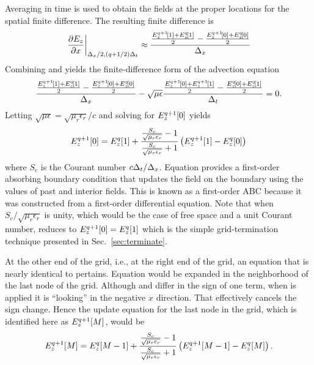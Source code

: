 Averaging in time is used to obtain the fields at the proper locations
for the spatial finite difference.  The resulting finite difference is
\begin{equation}
  \left.
    \frac{\partial E_z}{\partial x}\right|_{\Delx/2,(q+1/2)\Delt}
  \approx
    \frac{
     \frac{\fdtd{E_z}{1}{q+1}+\fdtd{E_z}{1}{q}}{2} -
     \frac{\fdtd{E_z}{0}{q+1}+\fdtd{E_z}{0}{q}}{2}
    }{\Delx}
  \label{eq:xDiffTimeAvg}
\end{equation}
Combining  and  yields
the finite-difference form of the advection equation
\begin{equation}
   \frac{
    \frac{\fdtd{E_z}{1}{q+1}+\fdtd{E_z}{1}{q}}{2} -
    \frac{\fdtd{E_z}{0}{q+1}+\fdtd{E_z}{0}{q}}{2}
   }{\Delx}
  -
   \sqrt{\mu\epsilon}
   \frac{
    \frac{\fdtd{E_z}{0}{q+1}+\fdtd{E_z}{1}{q+1}}{2} -
    \frac{\fdtd{E_z}{0}{q}+\fdtd{E_z}{1}{q}}{2}
   }{\Delt}
 = 0.
\end{equation}
Letting $\sqrt{\mu\epsilon}=\sqrt{\mu_r\epsilon_r}/c$ and
solving for $\fdtd{E_z}{0}{q+1}$ yields
\begin{equation}
  \fdtd{E_z}{0}{q+1} = \fdtd{E_z}{1}{q} +
    \frac{\frac{S_c}{\sqrt{\mu_r\epsilon_r}}-1}
         {\frac{S_c}{\sqrt{\mu_r\epsilon_r}}+1}
    \left(\fdtd{E_z}{1}{q+1}-\fdtd{E_z}{0}{q}\right)
  \label{eq:firstOrderABC}
\end{equation}
where $S_c$ is the Courant number $c\Delt/\Delx$.  Equation
 provides a first-order absorbing boundary
condition that updates the field on the boundary using the values of
past and interior fields.  This is known as a first-order ABC because
it was constructed from a first-order differential equation.
Note that when $S_c/\sqrt{\mu_r\epsilon_r}$
is unity, which would be the case of free space and a unit Courant
number,  reduces to $\fdtd{E_z}{0}{q+1} =
\fdtd{E_z}{1}{q}$ which is the simple grid-termination
technique presented in Sec.\ \ref{sec:terminate}.

At the other end of the grid, i.e., at the right end of the grid, an
equation that is nearly identical to 
pertains.  Equation  would be expanded in the
neighborhood of the last node of the grid.  Although
 and  differ in the sign of
one term, when  is applied it is ``looking'' in
the negative $x$ direction.  That effectively cancels the sign change.
Hence the update equation for the last node in the grid, which is
identified here as $\fdtd{E_z}{M}{q+1}$, would be
\begin{equation}
  \fdtd{E_z}{M}{q+1} = \fdtd{E_z}{M-1}{q} +
    \frac{\frac{S_c}{\sqrt{\mu_r\epsilon_r}}-1}
         {\frac{S_c}{\sqrt{\mu_r\epsilon_r}}+1}
    \left(\fdtd{E_z}{M-1}{q+1}-\fdtd{E_z}{M}{q}\right).
  \label{eq:firstOrderABCI}
\end{equation}

